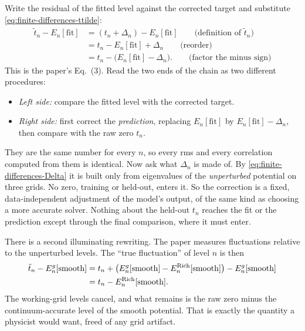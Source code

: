 Write the residual of the fitted level against the corrected target and substitute \eqref{eq:finite-differences-ttilde}:
\begin{align}
\tilde t_n-E_n[\mathrm{fit}]&=(t_n+\Delta_n)-E_n[\mathrm{fit}]\qquad\text{(definition of }\tilde t_n\text{)}\nonumber\\
&=t_n-E_n[\mathrm{fit}]+\Delta_n\qquad\text{(reorder)}\nonumber\\
&=t_n-\big(E_n[\mathrm{fit}]-\Delta_n\big).\qquad\text{(factor the minus sign)}
\label{eq:finite-differences-leakage}
\end{align}
This is the paper's Eq.~(3). Read the two ends of the chain as two different procedures:
\begin{itemize}
\item \emph{Left side:} compare the fitted level with the corrected target.
\item \emph{Right side:} first correct the \emph{prediction}, replacing $E_n[\mathrm{fit}]$ by $E_n[\mathrm{fit}]-\Delta_n$, then compare with the raw zero $t_n$.
\end{itemize}
They are the same number for every $n$, so every rms and every correlation computed from them is identical. Now ask what $\Delta_n$ is made of. By \eqref{eq:finite-differences-Delta} it is built only from eigenvalues of the \emph{unperturbed} potential on three grids. No zero, training or held-out, enters it. So the correction is a fixed, data-independent adjustment of the model's output, of the same kind as choosing a more accurate solver. Nothing about the held-out $t_n$ reaches the fit or the prediction except through the final comparison, where it must enter.

There is a second illuminating rewriting. The paper measures fluctuations relative to the unperturbed levels. The ``true fluctuation'' of level $n$ is then
\begin{align*}
\tilde t_n-E_n^{g}[\mathrm{smooth}]&=t_n+\big(E_n^{g}[\mathrm{smooth}]-E_n^{\rm Rich}[\mathrm{smooth}]\big)-E_n^{g}[\mathrm{smooth}]\\
&=t_n-E_n^{\rm Rich}[\mathrm{smooth}].
\end{align*}
The working-grid levels cancel, and what remains is the raw zero minus the continuum-accurate level of the smooth potential. That is exactly the quantity a physicist would want, freed of any grid artifact.

